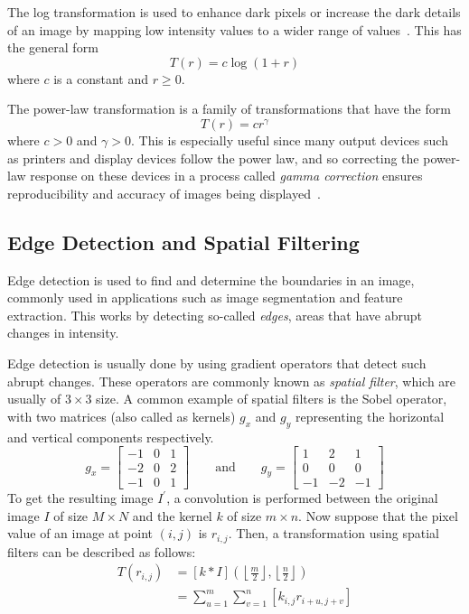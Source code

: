 The log transformation is used to enhance dark pixels or increase the dark details of an image by mapping low intensity values to a wider range of values~\cite{gonzalez_digital_2008}. This has the general form
\begin{equation}
    T\left(r\right) = c \log\left(1 + r\right)
\end{equation}
where $c$ is a constant and $r \ge 0$.

The power-law transformation is a family of transformations that have the form
\begin{equation}
    T\left(r\right) = c r^{\gamma}
\end{equation}
where $c>0$ and $\gamma > 0$. This is especially useful since many output devices such as printers and display devices follow the power law, and so correcting the power-law response on these devices in a process called \textit{gamma correction} ensures reproducibility and accuracy of images being displayed~\cite{gonzalez_digital_2008}.

\subsection{Edge Detection and Spatial Filtering}
Edge detection is used to find and determine the boundaries in an image, commonly used in applications such as image segmentation and feature extraction. This works by detecting so-called \textit{edges}, areas that have abrupt changes in intensity.

Edge detection is usually done by using gradient operators that detect such abrupt changes. These operators are commonly known as \textit{spatial filter}, which are usually of $3 \times 3$ size. A common example of spatial filters is the Sobel operator, with two matrices (also called as kernels) $g_x$ and $g_y$ representing the horizontal and vertical components respectively.
\begin{equation}
    g_x =
    \begin{bmatrix}
        -1 & 0 & 1 \\
        -2 & 0 & 2 \\
        -1 & 0 & 1
    \end{bmatrix}
    \qquad\text{and}\qquad
    g_y =
    \begin{bmatrix}
        1 & 2 & 1 \\
        0 & 0 & 0 \\
        -1 & -2 & -1
    \end{bmatrix}
\end{equation}
To get the resulting image $I^\prime$, a convolution is performed between the original image $I$ of size $M \times N$ and the kernel $k$ of size $m \times n$. Now suppose that the pixel value of an image at point $\left(i,j\right)$ is $r_{i,j}$. Then, a transformation using spatial filters can be described as follows:
\begin{align}
    T\left(r_{i,j}\right) &= \left[k * I\right]\left(\left\lfloor\frac{m}{2}\right\rfloor, \left\lfloor\frac{n}{2}\right\rfloor \right) \\
                         &= \sum_{u=1}^{m} \sum_{v=1}^{n} \left[k_{i,j} r_{i+u, j+v} \right]
\end{align}

